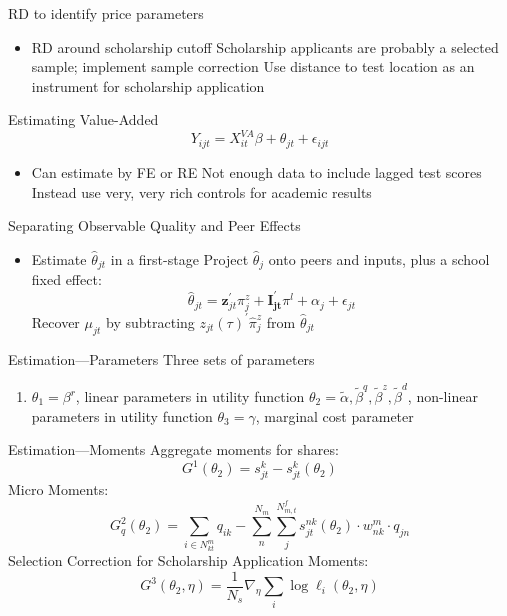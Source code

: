 \documentclass[dvipsnames]{beamer}
\begin{document}
%
\begin{frame}{RD to identify price parameters}
  \begin{itemize}
  \item RD around scholarship cutoff
    \vitem Scholarship applicants are probably a selected sample; implement sample correction
    \vitem Use distance to test location as an instrument for scholarship application
  \end{itemize}
\end{frame}
%
\begin{frame}{Estimating Value-Added}
  \[
Y_{i j t}=X_{i t}^{V A} \beta+\theta_{j t}+\epsilon_{i j t}
  \]
  \begin{itemize}
    \item Can estimate by FE or RE
  \vitem Not enough data to include lagged test scores
    \vitem Instead use very, very rich controls for academic results
  \end{itemize}
\end{frame}
%
\begin{frame}{Separating Observable Quality and Peer Effects}
  \begin{itemize}
  \item Estimate $\hat{\theta}_{jt}$ in a first-stage
    \vitem Project $\hat{\theta}_j$ onto peers and inputs, plus a school fixed effect:
    \[
\hat{\theta}_{j t}=\mathbf{z}_{j t}^{\prime} \pi_{j}^{z}+\mathbf{I}_{\mathbf{j t}}^{\prime} \pi^{l}+\alpha_{j}+\epsilon_{j t}
    \]
    \vitem Recover $\mu_{jt}$ by subtracting $z_{jt}(\tau)^\prime \hat{\pi}^z_j$ from $\hat{\theta}_{jt}$
  \end{itemize}
\end{frame}
%
\begin{frame}{Estimation---Parameters }
  Three sets of parameters
  \begin{enumerate}
  \item $\theta_1 = \beta^r$, linear parameters in utility function
    \vitem $\theta_2 = \tilde{\alpha}, \tilde{\beta}^q, \tilde{\beta}^z, \tilde{\beta}^d$, non-linear parameters in utility function
    \vitem $\theta_3 = \gamma$, marginal cost parameter
  \end{enumerate}
\end{frame}
%
\begin{frame}{Estimation---Moments}
  Aggregate moments for shares:
  \[
G^{1}\left(\theta_{2}\right)=s_{j t}^{k}-s_{j t}^{k}\left(\theta_{2}\right)
\]
\vfill
  Micro Moments:
  \[
G_{q}^{2}\left(\theta_{2}\right)=\sum_{i \in N_{k t}^{m}} q_{i k}-\sum_{n}^{N_{m}} \sum_{j}^{N_{m, t}^{f}} s_{j t}^{n k}\left(\theta_{2}\right) \cdot w_{n k}^{m} \cdot q_{j n}
  \]
  \vfill
  Selection Correction for Scholarship Application Moments:
  \[
G^{3}\left(\theta_{2}, \eta\right)=\frac{1}{N_{s}} \nabla_{\eta} \sum_{i} \log \ell_{i}\left(\theta_{2}, \eta\right)
  \]
  \vfill
\end{frame}
\end{document}
